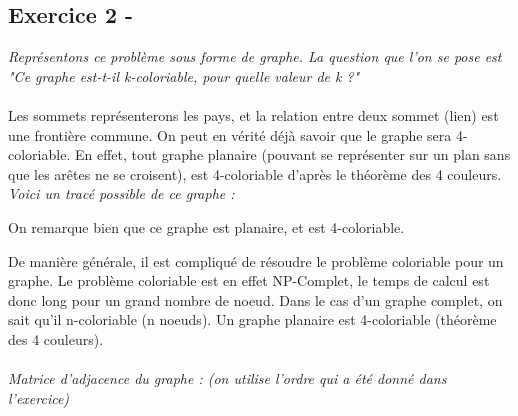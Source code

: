 \documentclass{article}
\begin{document}
\subsection*{Exercice 2 -}
\textit{Représentons ce problème sous forme de graphe. La question que l'on se pose est "Ce graphe est-t-il k-coloriable, pour quelle valeur de k ?"}\\\\
\linebreak
\textsf{Les sommets représenterons les pays, et la relation entre deux sommet (lien) est une frontière commune.}
\textsf{On peut en vérité déjà savoir que le graphe sera 4-coloriable. En effet, tout graphe planaire (pouvant se représenter sur un plan sans que les arêtes ne se croisent), est 4-coloriable d'après le théorème des 4 couleurs.}\\
\linebreak
\textit{Voici un tracé possible de ce graphe :}
	\begin{center}
		\textsf{On remarque bien que ce graphe est planaire, et est 4-coloriable.}
	\end{center}
\textsf{De manière générale, il est compliqué de résoudre le problème coloriable pour un graphe.}
\textsf{Le problème coloriable est en effet NP-Complet, le temps de calcul est donc long pour un grand nombre de noeud.}
\textsf{Dans le cas d'un graphe complet, on sait qu'il n-coloriable (n noeuds).}
\textsf{Un graphe planaire est 4-coloriable (théorème des 4 couleurs).}\\\\
\textit{Matrice d'adjacence du graphe : (on utilise l'ordre qui a été donné dans l'exercice)}
\end{document}
